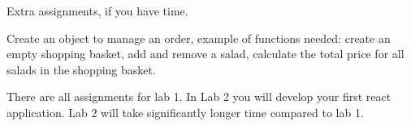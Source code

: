 \documentclass[fleqn, article, a4paper]{memoir}
\begin{document}
\noindent Extra assignments, if you have time.
\begin{Assignments}

\item Create an object to manage an order, example of functions needed: create an empty shopping basket, add and remove a salad, calculate the total price for all salads in the shopping basket.

\end{Assignments}

\noindent There are all assignments for lab 1. In Lab 2 you will develop your first react application. Lab 2 will take significantly longer time compared to lab 1.


\end{document}
